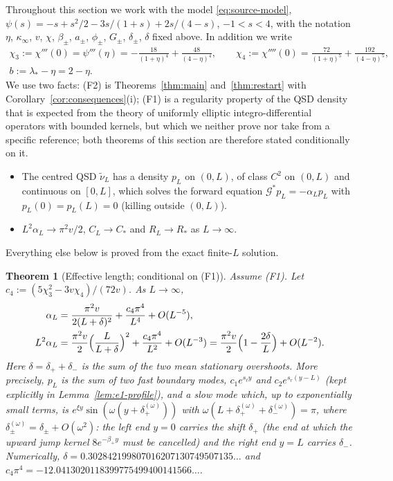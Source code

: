 \documentclass[11pt,a4paper]{article}
\newtheorem{theorem}{Theorem}[section]
\theoremstyle{definition}
\theoremstyle{remark}
\newcommand{\1}{\mathbf 1}
\begin{document}
Throughout this section we work with the model \eqref{eq:source-model},
$\psi(s)=-s+s^2/2-3s/(1+s)+2s/(4-s)$, $-1<s<4$, with the notation $\eta$, $\kappa_\infty$, $v$, $\chi$, $\beta_\pm$, $a_\pm$,
$\phi_\pm$, $G_\pm$, $\delta_\pm$, $\delta$ fixed above. In addition we write
\begin{gather*}
\chi_3:=\chi'''(0)=\psi'''(\eta)=-\frac{18}{(1+\eta)^4}+\frac{48}{(4-\eta)^4},\qquad
\chi_4:=\chi''''(0)=\frac{72}{(1+\eta)^5}+\frac{192}{(4-\eta)^5},\\
b:=\lambda_*-\eta=2-\eta .
\end{gather*}
We use two facts: (F2) is Theorems~\ref{thm:main} and~\ref{thm:restart} with Corollary~\ref{cor:consequences}(i); (F1) is a regularity property of the QSD density that is expected from the theory of uniformly elliptic integro-differential operators with bounded kernels, but which we neither prove nor take from a specific reference; both theorems of this section are therefore stated conditionally on it.
\begin{itemize}
\item[(F1)] The centred QSD $\widetilde\nu_L$ has a density $p_L$ on $(0,L)$, of class
$C^2$ on $(0,L)$ and continuous on $[0,L]$, which solves the forward equation
$\mathcal G^*p_L=-\alpha_Lp_L$ with $p_L(0)=p_L(L)=0$ (killing outside $(0,L)$).
\item[(F2)] $L^2\alpha_L\to\pi^2v/2$, $C_L\to C_*$ and $R_L\to R_*$ as $L\to\infty$.
\end{itemize}
Everything else below is proved from the exact finite-$L$ solution.

\begin{theorem}[Effective length; conditional on (F1)]\label{thm:e1-alpha}
Assume (F1). Let $c_4:=(5\chi_3^2-3v\chi_4)/(72v)$. As $L\to\infty$,
\begin{align*}
\alpha_L&=\frac{\pi^2v}{2(L+\delta)^2}+\frac{c_4\pi^4}{L^4}+O(L^{-5}),\\
L^2\alpha_L&=\frac{\pi^2v}{2}\Bigl(\frac{L}{L+\delta}\Bigr)^2+\frac{c_4\pi^4}{L^2}+O(L^{-3})
=\frac{\pi^2v}{2}\Bigl(1-\frac{2\delta}{L}\Bigr)+O(L^{-2}).
\end{align*}
Here $\delta=\delta_++\delta_-$ is the sum of the two mean stationary overshoots.
More precisely, $p_L$ is the sum of two fast boundary modes, $c_1e^{s_\ell y}$ and $c_2e^{s_r(y-L)}$ (kept explicitly in Lemma~\ref{lem:e1-profile}), and a slow mode which, up to exponentially small terms, is
$e^{\xi y}\sin(\omega(y+\delta_+^{(\omega)}))$ with $\omega(L+\delta_+^{(\omega)}+\delta_-^{(\omega)})=\pi$,
where $\delta_\pm^{(\omega)}=\delta_\pm+O(\omega^2)$: the left end $y=0$
carries the shift $\delta_+$ (the end at which the upward jump kernel
$8e^{-\beta_+y}$ must be cancelled) and the right end $y=L$ carries $\delta_-$.
Numerically, $\delta=0.302842199807016207130749507135\ldots$ and
$c_4\pi^4=-12.0413020118399775499400141566\ldots$.
\end{theorem}
\end{document}
